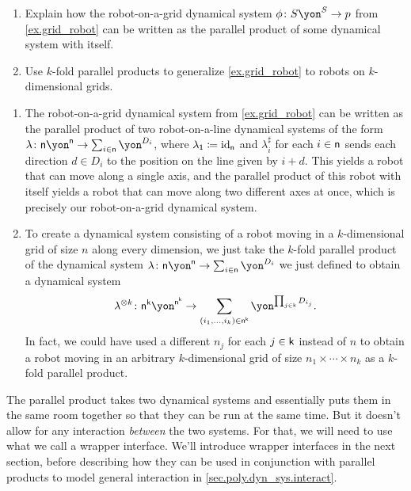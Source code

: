 \documentclass[Book-Poly]{subfiles}
\begin{document}
\begin{exercise} \label{exc.grid_robot_par}
\begin{enumerate}
    \item Explain how the robot-on-a-grid dynamical system $\phi\colon S\yon^S\to p$ from \cref{ex.grid_robot} can be written as the parallel product of some dynamical system with itself.
    \item Use $k$-fold parallel products to generalize \cref{ex.grid_robot} to robots on $k$-dimensional grids.\qedhere
\end{enumerate}
\begin{solution}
\begin{enumerate}
    \item The robot-on-a-grid dynamical system from \cref{ex.grid_robot} can be written as the parallel product of two robot-on-a-line dynamical systems of the form $\lambda\colon\ord{n}\yon^{\ord{n}}\to\sum_{i\in\ord{n}}\yon^{D_i}$, where $\lambda_{\textsf{1}}\coloneqq\mathrm{id}_{\mathsf{n}}$ and $\lambda^\sharp_i$ for each $i\in\mathsf{n}$ sends each direction $d\in D_i$ to the position on the line given by $i+d$.
    This yields a robot that can move along a single axis, and the parallel product of this robot with itself yields a robot that can move along two different axes at once, which is precisely our robot-on-a-grid dynamical system.
    \item To create a dynamical system consisting of a robot moving in a $k$-dimensional grid of size $n$ along every dimension, we just take the $k$-fold parallel product of the dynamical system $\lambda\colon\ord{n}\yon^{\ord{n}}\to\sum_{i\in\ord{n}}\yon^{D_i}$ we just defined to obtain a dynamical system \[\lambda^{\otimes k}\colon\ord{n}^\ord{k}\yon^{\ord{n}^\ord{k}}\to\sum_{(i_1,\ldots,i_k)\in\ord{n}^\ord{k}}\yon^{\prod_{j\in\ord{k}}D_{i_j}}.\]
    In fact, we could have used a different $n_j$ for each $j\in\mathsf{k}$ instead of $n$ to obtain a robot moving in an arbitrary $k$-dimensional grid of size $n_1\times\cdots\times n_k$ as a $k$-fold parallel product.
\end{enumerate}
\end{solution}
\end{exercise}

The parallel product takes two dynamical systems and essentially puts them in the same room together so that they can be run at the same time.
But it doesn't allow for any interaction \emph{between} the two systems.
For that, we will need to use what we call a wrapper interface.
We'll introduce wrapper interfaces in the next section, before describing how they can be used in conjunction with parallel products to model general interaction in \cref{sec.poly.dyn_sys.interact}.
\end{document}
